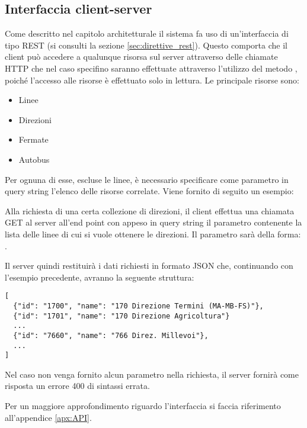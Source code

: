 \subsection{Interfaccia client-server} %
\label{sub:interfaccia_client_server}

Come descritto nel capitolo architetturale il sistema fa uso di un'interfaccia di tipo REST (si consulti la sezione \ref{sec:direttive_rest}). Questo comporta che il client può accedere a qualunque risorsa sul server attraverso delle chiamate HTTP che nel caso specifino saranno effettuate attraverso l'utilizzo del metodo , poiché l'accesso alle risorse è effettuato solo in lettura.
Le principale risorse sono:
\begin{itemize}
  \item Linee
  \item Direzioni
  \item Fermate
  \item Autobus
\end{itemize}

Per ognuna di esse, escluse le linee, è necessario specificare come parametro in query string l'elenco delle risorse correlate.
Viene fornito di seguito un esempio:

Alla richiesta di una certa collezione di direzioni, il client effettua una chiamata GET al server all'end point  con appeso in query string il parametro contenente la lista delle linee di cui si vuole ottenere le direzioni.
Il parametro sarà della forma: .

Il server quindi restituirà i dati richiesti in formato JSON che, continuando con l'esempio precedente, avranno la seguente struttura:
\vspace{1cm}
{\small
\begin{verbatim}
[
  {"id": "1700", "name": "170 Direzione Termini (MA-MB-FS)"},
  {"id": "1701", "name": "170 Direzione Agricoltura"}
  ...
  {"id": "7660", "name": "766 Direz. Millevoi"},
  ...
]
 \end{verbatim} 
}
\vspace{1cm}
\newpage

Nel caso non venga fornito alcun parametro nella richiesta, il server fornirà come risposta un errore 400 di sintassi errata.

Per un maggiore approfondimento riguardo l'interfaccia si faccia riferimento all'appendice \ref{apx:API}.\\

